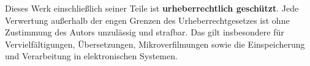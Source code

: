 \begin{titlepage}
\small
\noindent
Dieses Werk einschließlich seiner Teile ist \textbf{urheberrechtlich geschützt}.
Jede Verwertung außerhalb der engen Grenzen des Urheberrechtgesetzes ist ohne
Zustimmung des Autors unzulässig und strafbar. Das gilt insbesondere für
Vervielfältigungen, Übersetzungen, Mikroverfilmungen sowie die Einspeicherung
und Verarbeitung in elektronischen Systemen.

\end{titlepage}